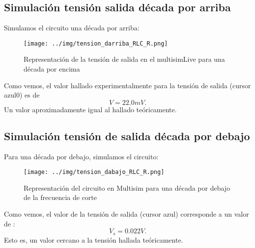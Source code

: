 \documentclass[11pt,letterpaper]{article}
\begin{document}
\subsection{Simulación tensión salida década por arriba}
Simulamos el circuito una década por arriba:
\begin{figure}[H]
    \centering
    \texttt{[image: ../img/tension\_darriba\_RLC\_R.png]}
    \caption{Representación de la tensión de salida en el multisimLive para una década por encima}
    \label{fig:}
\end{figure}
Como vemos, el valor hallado experimentalmente para la tensión de salida (cursor azul0) es de \[
V=22.0 mV
.\] 
Un valor aproximadamente igual al hallado teóricamente.


\subsection{Simulación tensión de salida década por debajo}
Para una década por debajo, simulamos el circuito:
\begin{figure}[H]
    \centering
    \texttt{[image: ../img/tension\_dabajo\_RLC\_R.png]}
    \caption{Representación del circuito en Multisim para una década por debajo de la frecuencia de corte}
    \label{fig:-}
\end{figure}    
Como vemos, el valor de la tensión de salida (cursor azul) corresponde a un valor de :
\[
V_s=0.022 V
.\] 
Esto es, un valor cercano a la tensión hallada teóricamente.
\end{document}
